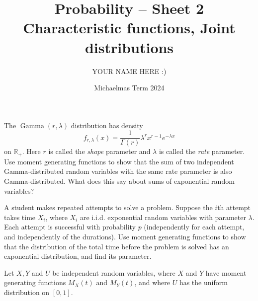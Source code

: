 \documentclass[answers]{exam}
\title{Probability -- Sheet 2\\Characteristic functions, Joint distributions}
\author{YOUR NAME HERE :)}
\date{Michaelmas Term 2024}
\begin{document}
\maketitle

\begin{questions}

\question%



\question%
The $\operatorname{Gamma}(r, \lambda)$ distribution has density \[
	f_{r, \lambda}(x)=\frac{1}{\Gamma(r)} \lambda^{r} x^{r-1} e^{-\lambda x}
\] on $\mathbb{R}_{+}$. Here $r$ is called the \emph{shape} parameter and $\lambda$ is called the \emph{rate} parameter. Use moment generating functions to show that the sum of two independent Gamma-distributed random variables with the same rate parameter is also Gamma-distributed. What does this say about sums of exponential random variables?



\question%
A student makes repeated attempts to solve a problem. Suppose the $i$th attempt takes time $X_{i}$, where $X_{i}$ are i.i.d. exponential random variables with parameter $\lambda$. Each attempt is successful with probability $p$ (independently for each attempt, and independently of the durations). Use moment generating functions to show that the distribution of the total time before the problem is solved has an exponential distribution, and find its parameter.



\question%
Let $X, Y$ and $U$ be independent random variables, where $X$ and $Y$ have moment generating functions $M_{X}(t)$ and $M_{Y}(t)$, and where $U$ has the uniform distribution on $[0,1]$.
\begin{parts}

\end{parts}
\end{questions}
\end{document}
